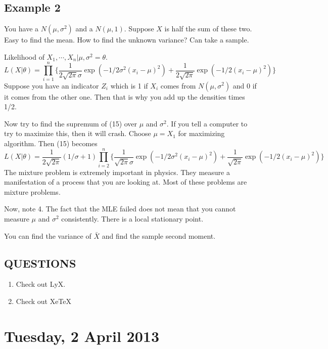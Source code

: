 \documentclass[letterpaper, 12pt]{article}
\theoremstyle{definition}
\theoremstyle{plain}
\begin{document}
\subsection*{Example 2}
You have a $N(\mu, \sigma^2)$ and a $N(\mu, 1)$. Suppose $X$ is half the sum of these two. Easy to find the mean. How to find the unknown variance? Can take a sample.

Likelihood of $X_1, \cdots, X_n | \mu, \sigma^2 = \theta$.
\begin{equation}
L( X | \theta) = \prod_{i=1}^n \{   \frac{1}{2 \sqrt{2 \pi} \sigma}       
\exp (-1/2\sigma^2 (x_i - \mu)^2)
+
\frac{1}{2 \sqrt{2 \pi}}       
\exp (-1/2 (x_i - \mu)^2)
\}
\end{equation}
Suppose you have an indicator $Z_i$ which is 1 if $X_i$ comes from $N(\mu, \sigma^2)$ and 0 if it comes from the other one. Then that is why you add up the densities times 1/2.

Now try to find the supremum of (15) over $\mu$ and $\sigma^2$. If you tell a computer to try to maximize this, then it will crash. Choose $\mu = X_1$ for maximizing algorithm. Then (15) becomes
\begin{equation}
L( X | \theta) = 
\frac{1}{2 \sqrt{2 \pi}} (1 / \sigma + 1)
\prod_{i=2}^n \{   \frac{1}{ \sqrt{2 \pi} \sigma}       
\exp (-1/2\sigma^2 (x_i - \mu)^2)
+
\frac{1}{ \sqrt{2 \pi}}       
\exp (-1/2 (x_i - \mu)^2)
\}
\end{equation}
The mixture problem is extremely important in physics. They measure a manifestation of a process that you are looking at. Most of these problems are mixture problems.

Now, note 4. The fact that the MLE failed does not mean that you cannot measure $\mu$ and $\sigma^2$ consistently. There is a local
stationary point.

You can find the variance of $\bar{X}$ and find the sample second moment.


\subsection*{QUESTIONS}
\begin{enumerate}
\item
Check out LyX.
\item 
Check out XeTeX
\end{enumerate}

\section{Tuesday, 2 April 2013}
\end{document}
